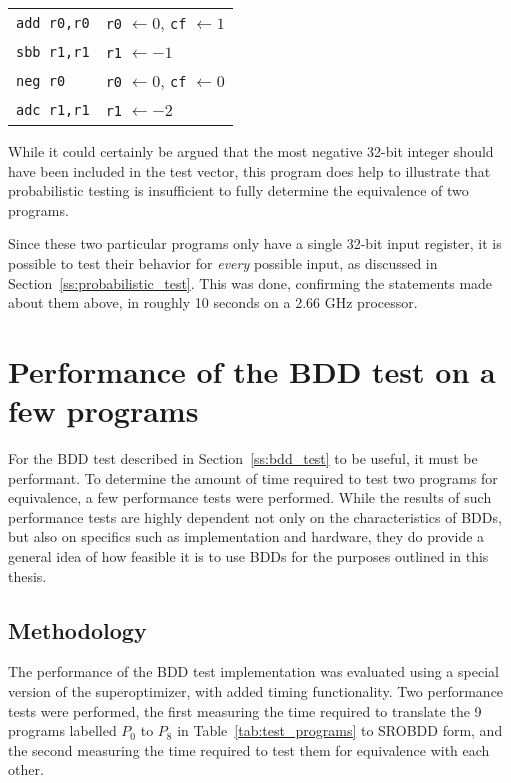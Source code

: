 \documentclass[a4paper,11pt]{kth-mag}
\renewcommand{\gets}{\leftarrow}
\begin{document}
\begin{table}
\centering
\begin{tabular}{l|l}
\verb|add r0,r0|
& \verb|r0| $\gets 0$, \verb|cf| $\gets 1$ \\
\verb|sbb r1,r1|
& \verb|r1| $\gets -1$ \\
\verb|neg r0|
& \verb|r0| $\gets 0$, \verb|cf| $\gets 0$ \\
\verb|adc r1,r1|
& \verb|r1| $\gets -2$ \\
\end{tabular}
\caption{}
\label{tab:sign_incorrect}
\end{table}

While it could certainly be argued that the most negative 32-bit integer should have been included in the test vector, this program does help to illustrate that probabilistic testing is insufficient to fully determine the equivalence of two programs.

Since these two particular programs only have a single 32-bit input register, it is possible to test their behavior for \emph{every} possible input, as discussed in Section~\ref{ss:probabilistic_test}.
This was done, confirming the statements made about them above, in roughly 10 seconds on a 2.66 GHz processor.

\section{Performance of the BDD test on a few programs}
\label{s:performance_programs}

For the BDD test described in Section~\ref{ss:bdd_test} to be useful, it must be performant.
To determine the amount of time required to test two programs for equivalence, a few performance tests were performed.
While the results of such performance tests are highly dependent not only on the characteristics of BDDs, but also on specifics such as implementation and hardware, they do provide a general idea of how feasible it is to use BDDs for the purposes outlined in this thesis.

\subsection{Methodology}

The performance of the BDD test implementation was evaluated using a special version of the superoptimizer, with added timing functionality.
Two performance tests were performed,
the first measuring the time required to translate the 9 programs labelled $P_0$ to $P_8$ in Table~\ref{tab:test_programs} to SROBDD form,
and the second measuring the time required to test them for equivalence with each other.
\end{document}
